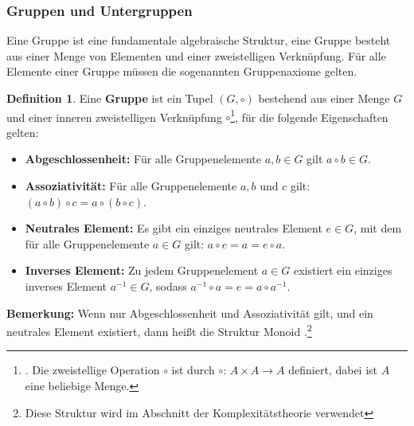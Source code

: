 \documentclass[12pt,oneside]{article}
\theoremstyle{remark}
\theoremstyle{definition}
\newtheorem{definition}{Definition}[section]
\begin{document}
\subsubsection{Gruppen und Untergruppen}
Eine Gruppe ist eine fundamentale algebraische Struktur, eine Gruppe besteht aus einer Menge von Elementen und einer zweistelligen Verknüpfung. Für alle Elemente einer Gruppe müssen die sogenannten Gruppenaxiome gelten.   
\begin{definition}
Eine \textbf{Gruppe} ist ein Tupel $(G, \circ)$ bestehend aus einer Menge $G$ und einer inneren zweistelligen Verknüpfung $\circ$\footnote{. Die zweistellige Operation $\circ$ ist durch $\circ: \, A \times A \to A$ definiert, dabei ist $A$ eine beliebige Menge.}, für die folgende Eigenschaften gelten:
\begin{itemize}
    \item \textbf{Abgeschlossenheit:} Für alle Gruppenelemente $a,b \in G$ gilt $a \circ b \in G$.\newline
    
    \item \textbf{Assoziativität:} Für alle Gruppenelemente $a,b$ und $c$ gilt:\newline
    $(a \circ b) \circ c = a \circ (b \circ c)$.\newline
    
    \item \textbf{Neutrales Element:} Es gibt ein einziges neutrales Element $e \in G$, mit dem für alle Gruppenelemente $a \in G$ gilt:\newline
    $a \circ e = a = e \circ a$.\newline
    
    \item \textbf{Inverses Element:} Zu jedem Gruppenelement $a \in G$ existiert ein einziges inverses Element $a^{-1} \in G$, sodass 
    $a^{-1} \circ a  = e = a \circ a^{-1}$.\newline
    
\end{itemize}
\end{definition}

\smallskip

\textbf{\small{Bemerkung:}} Wenn nur Abgeschlossenheit und  Assoziativität gilt, und ein neutrales Element existiert, dann heißt die Struktur Monoid \cite{monoid}.\footnote{Diese Struktur wird im Abschnitt der Komplexitätstheorie verwendet} 
\end{document}
